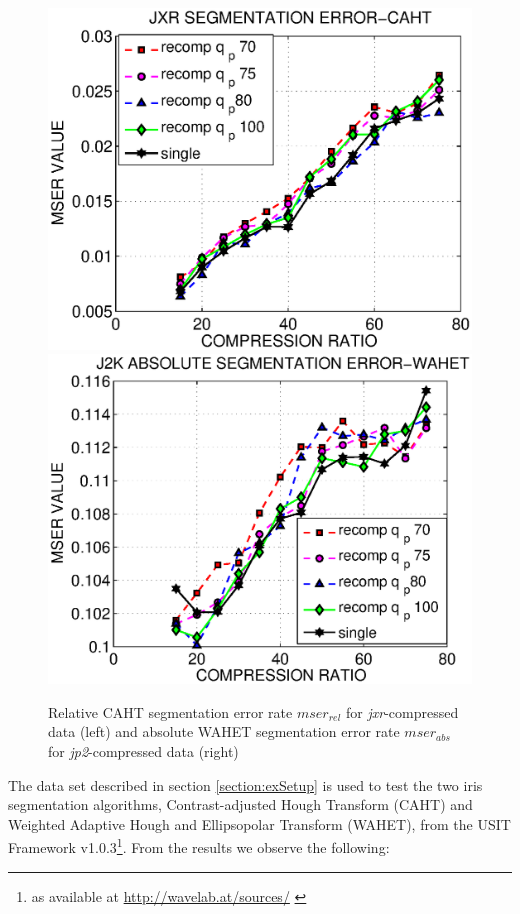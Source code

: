 \documentclass[10pt,twocolumn,letterpaper]{article}
\begin{document}
\begin{figure}
	\includegraphics[width=0.49\linewidth]{img/new/jxr_caht.eps}
	\includegraphics[width=0.49\linewidth]{img/new/j2k_abs_wahet.eps}	
	\caption{Relative CAHT segmentation error rate $mser_{rel}$ for \emph{jxr}-compressed data (left) and absolute WAHET segmentation error rate $mser_{abs}$ for \emph{jp2}-compressed data (right)}
	\label{fig:segResultsOther}
\end{figure}


The data set described in section \ref{section:exSetup} is used to test the two iris segmentation algorithms, Contrast-adjusted Hough Transform (CAHT) and Weighted Adaptive Hough and Ellipsopolar Transform (WAHET), from the USIT Framework v1.0.3\footnote{as available at \url{http://wavelab.at/sources/} \cite{rathgeb}}. From the results we observe the following:
\end{document}
